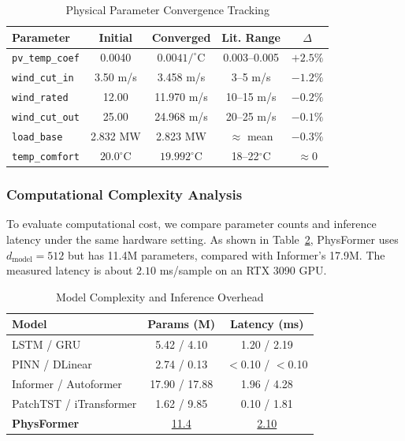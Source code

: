 \begin{table}[tbp]
\centering
\caption{Physical Parameter Convergence Tracking}
\label{tab:physical_params}
\scriptsize
\setlength{\tabcolsep}{3pt}
\begin{tabular*}{\columnwidth}{@{\extracolsep{\fill}}lcccc@{}}
\toprule
Parameter & Initial & Converged & Lit. Range & $\Delta$ \\
\midrule
\texttt{pv\_temp\_coef} & 0.0040 & $0.0041/^\circ$C & 0.003--0.005 & $+2.5\%$ \\
\texttt{wind\_cut\_in} & 3.50 m/s & 3.458 m/s & 3--5 m/s & $-1.2\%$ \\
\texttt{wind\_rated} & 12.00 & 11.970 m/s & 10--15 m/s & $-0.2\%$ \\
\texttt{wind\_cut\_out} & 25.00 & 24.968 m/s & 20--25 m/s & $-0.1\%$ \\
\texttt{load\_base} & 2.832 MW & 2.823 MW & $\approx$ mean & $-0.3\%$ \\
\texttt{temp\_comfort} & $20.0^\circ$C & $19.992^\circ$C & 18--22$^\circ$C & $\approx 0$ \\
\bottomrule
\end{tabular*}
\end{table}

\subsubsection{Computational Complexity Analysis}
\label{subsubsec:overhead}

To evaluate computational cost, we compare parameter counts and inference latency under the same hardware setting. As shown in Table~\ref{tab:overhead}, PhysFormer uses $d_\text{model}=512$ but has 11.4M parameters, compared with Informer's 17.9M. The measured latency is about $2.10$ ms/sample on an RTX 3090 GPU.

\begin{table}[!htbp]
\centering
\caption{Model Complexity and Inference Overhead}
\label{tab:overhead}
\scriptsize
\setlength{\tabcolsep}{2pt}
\begin{tabular*}{\columnwidth}{@{\extracolsep{\fill}}lcc@{}}
\toprule
Model & Params (M) & Latency (ms) \\
\midrule
LSTM / GRU & 5.42 / 4.10 & 1.20 / 2.19 \\
PINN / DLinear & 2.74 / 0.13 & $<$0.10 / $<$0.10 \\
Informer / Autoformer & 17.90 / 17.88 & 1.96 / 4.28 \\
PatchTST / iTransformer & 1.62 / 9.85 & 0.10 / 1.81 \\
\textbf{PhysFormer} & \underline{11.4} & \underline{2.10} \\
\bottomrule
\end{tabular*}
\end{table}


